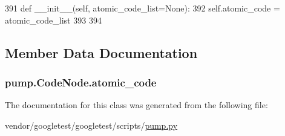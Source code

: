 \begin{DoxyCode}
391   \textcolor{keyword}{def }\_\_init\_\_(self, atomic\_code\_list=None):
392     self.atomic\_code = atomic\_code\_list
393 
394 
\end{DoxyCode}


\subsection{Member Data Documentation}
\subsubsection[{\texorpdfstring{atomic\+\_\+code}{atomic_code}}]{\setlength{\rightskip}{0pt plus 5cm}pump.\+Code\+Node.\+atomic\+\_\+code}\hypertarget{classpump_1_1CodeNode_ac7251110cc987c709e0e17d95521993e}{}\label{classpump_1_1CodeNode_ac7251110cc987c709e0e17d95521993e}


The documentation for this class was generated from the following file\+:\begin{DoxyCompactItemize}
\item 
vendor/googletest/googletest/scripts/\hyperlink{pump_8py}{pump.\+py}\end{DoxyCompactItemize}
